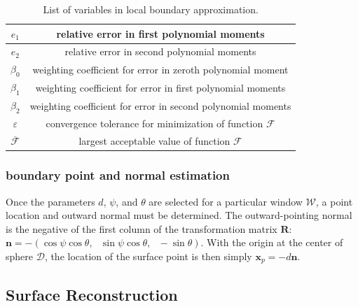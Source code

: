 \begin{linenomath}
\begin{table}[t!]
\begin{tabular}{|c||c|}
   $e_1$ & relative error in first polynomial moments \\ \hline
   $e_2$ & relative error in second polynomial moments \\ \hline   
   $\beta_0$ & weighting coefficient for error in zeroth polynomial moment \\ \hline
   $\beta_1$ & weighting coefficient for error in first polynomial moments \\ \hline
   $\beta_2$ & weighting coefficient for error in second polynomial moments \\ \hline 
   $\varepsilon$ & convergence tolerance for minimization of function $\mathcal{F}$ \\ \hline
   $\overline{\mathcal{F}}$ \rule{0mm}{4mm} & largest acceptable value of function $\mathcal{F}$ \\ \hline        
\end{tabular}
\caption{List of variables in local boundary approximation.}
\label{tab:surface}
\end{table}\end{linenomath}

\subsubsection{boundary point and normal estimation}

Once the parameters $d$, $\psi$, and $\theta$ are selected for a particular window $\mathcal{W}$, a point location and outward normal must be determined. The outward-pointing normal is the negative of the first column of the transformation matrix $\bm{R}$: $\bm{n} = -(\cos\psi\cos\theta,\text{\ }\sin\psi\cos\theta,\text{\ }-\sin\theta)$. With the origin at the center of sphere $\mathcal{D}$, the location of the surface point is then simply $\mathbf{x}_p = -d\bm{n}$.

\subsection{Surface Reconstruction}
\label{Surface Reconstruction}


